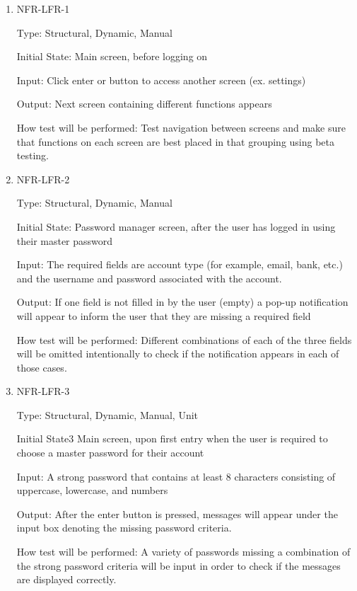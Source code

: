 \documentclass[12pt, titlepage]{article}
\begin{document}
\begin{enumerate}

\item{NFR-LFR-1\\}

Type: Structural, Dynamic, Manual

Initial State: Main screen, before logging on

Input: Click enter or button to access another screen (ex. settings)

Output: Next screen containing different functions appears

How test will be performed: Test navigation between screens and make sure that functions on each screen are best placed in that grouping using beta testing.

\item{NFR-LFR-2\\}

Type: Structural, Dynamic, Manual

Initial State: Password manager screen, after the user has logged in using their master password

Input: The required fields are account type (for example, email, bank, etc.) and the username and password associated with the account.

Output: If one field is not filled in by the user (empty) a pop-up notification will appear to inform the user that they are missing a required field

How test will be performed: Different combinations of each of the three fields will be omitted intentionally to check if the notification appears in each of those cases.

\item{NFR-LFR-3\\}

Type: Structural, Dynamic, Manual, Unit

Initial State3 Main screen, upon first entry when the user is required to choose a master password for their account

Input: A strong password that contains at least 8 characters consisting of uppercase, lowercase, and numbers

Output: After the enter button is pressed, messages will appear under the input box denoting the missing password criteria.

How test will be performed: A variety of passwords missing a combination of the strong password criteria will be input in order to check if the messages are displayed correctly.


\end{enumerate}
\end{document}
